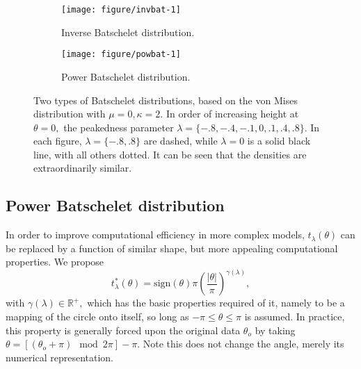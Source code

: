 \begin{figure}
\begin{center}
  \begin{subfigure}[t]{0.5\linewidth}
\begin{knitrout}
\color{fgcolor}
\texttt{[image: figure/invbat-1]} 

\end{knitrout}
    \caption{Inverse Batschelet distribution.}
    \label{fig:pdf_compare:invbat}
  \end{subfigure}%
  \begin{subfigure}[t]{0.5\linewidth}
\begin{knitrout}
\color{fgcolor}
\texttt{[image: figure/powbat-1]} 

\end{knitrout}
    \caption{Power Batschelet distribution.}
    \label{fig:pdf_compare:powbat}
  \end{subfigure}%
\end{center}
\caption{Two types of Batschelet distributions, based on the von Mises distribution with \(\mu = 0, \kappa = 2\). In order of increasing height at \(\theta = 0,\) the peakedness parameter \(\lambda = \{-.8, -.4, -.1, 0, .1, .4, .8\}\). In each figure, \(\lambda = \{-.8, .8\}\) are dashed, while \(\lambda = 0\) is a solid black line, with all others dotted. It can be seen that the densities are extraordinarily similar.}
\label{fig:pdf_compare}
\end{figure}

\subsection{Power Batschelet distribution}

In order to improve computational efficiency in more complex models, \(t_\lambda(\theta)\) can be replaced by a function of similar shape, but more appealing computational properties. We propose
\begin{equation}
  t_{\lambda}^\ast(\theta) = \text{sign}(\theta)\pi \left( \frac{\vert\theta\vert}{\pi} \right)^{\gamma(\lambda)},
\end{equation}
with \(\gamma(\lambda) \in \mathbb{R}^+,\) which has the basic properties required of it, namely to be a mapping of the circle onto itself, so long as \(-\pi \leq \theta \leq \pi \) is assumed. In practice, this property is generally forced upon the original data \(\theta_{o}\) by taking \( \theta = [(\theta_{o} + \pi) \mod 2\pi] - \pi.\) Note this does not change the angle, merely its numerical representation.

